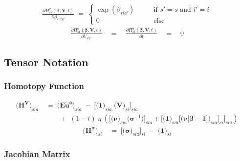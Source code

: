 \documentclass[11pt,fleqn]{article}
\newcommand{\bsigma}{\bm{\sigma}}
\newcommand{\bbeta}{\bm{\beta}}
\newcommand{\bV}{\bm{V}}
\newcommand{\bnu}{\bm{\nu}}
\newcommand{\bone}{\bm{1}}
\newcommand{\tu}{\tilde{u}}
\begin{document}
\begin{align*}
	\frac{ \partial H^\sigma_{si}(\bbeta,\bV,t) }{ \partial \beta_{s'i'a'}} \;=\; 
		\begin{cases}
			\exp(\beta_{sia'}) \qquad&\text{if } s'=s \text{ and } i'=i \\
			0 \qquad&\text{else}  
		\end{cases}
\end{align*}
\begin{align*}
	\frac{ \partial H^\sigma_{si}(\bbeta,\bV,t) }{ \partial V_{s'i'} } \quad=\quad \frac{ \partial H^\sigma_{si}(\bbeta,\bV,t) }{ \partial t } \quad=\quad 0
\end{align*}




\subsection*{Tensor Notation}


\subsubsection*{Homotopy Function}

\begin{align*}
	\biggl( \bm{H^{V}} \biggr)_{sia} & \;=\; 
		\biggl( \bm{{E\tu^{a}}} \biggr)_{sia} \;-\; \Biggl[ \biggl( \bone \biggr)_{sia} \; \biggl( \bV \biggr)_{si} \Biggr]_{sia} \\
		& \qquad \;+\; (1-t) \: \eta \; \left( \Biggl[ \biggl( \bnu \biggr)_{sia} \biggl( \bsigma^{-1} \biggr) \Biggr]_{sia} + \Biggl[ \biggl( \bone \biggr)_{sia} \Biggl[ \biggl( \bnu\bigl[\bbeta-\bone\bigr] \biggr)_{sia} \Biggr]_{si} \Biggr]_{sia} \right)
\end{align*}
\begin{align*}
	\biggl( \bm{H^{\sigma}} \biggr)_{si} & \;=\; 
		\Biggl[ \biggl( \bsigma \biggr)_{sia} \Biggr]_{si} \;-\; \biggl( \bone \biggr)_{si} 
\end{align*}


\subsubsection*{Jacobian Matrix} 
\end{document}
